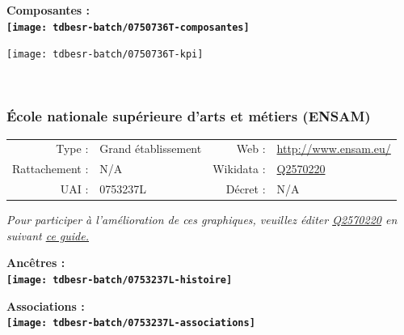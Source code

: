 \documentclass[12pt,french,]{article}
\begin{document}
\hrulefill

\begin{center} \bf Composantes : \\  
\texttt{[image: tdbesr-batch/0750736T-composantes]} \end{center}

\begin{center}\texttt{[image: tdbesr-batch/0750736T-kpi]} \end{center}\checkoddpage

\ifoddpage \fi ~\newpage  

\hypertarget{uxe9cole-nationale-supuxe9rieure-darts-et-muxe9tiers-ensam}{%
\subsubsection{École nationale supérieure d'arts et métiers
(ENSAM)}\label{uxe9cole-nationale-supuxe9rieure-darts-et-muxe9tiers-ensam}}

\begin{tabular*}{\textwidth}{rp{5cm}rl}  
\hline  
Type : & Grand établissement & Web : &\href{http://www.ensam.eu/}{http://www.ensam.eu/} \\  
Rattachement : & N/A & Wikidata : & \href{https://www.wikidata.org/entity/Q2570220}{Q2570220} \\  
UAI : & 0753237L & Décret : & N/A \\  
\hline  
\end{tabular*}

\textit{\scriptsize Pour participer à l'amélioration de ces graphiques, veuillez éditer  \href{https://www.wikidata.org/entity/Q2570220}{Q2570220}  en suivant \href{https://github.com/cpesr/wikidataESR/blob/master/Rmd/wikidataESR.md}{ce guide.}}

\vspace{1cm}  
\begin{minipage}[b]{0.50\textwidth}\begin{center} \bf Ancêtres : \\  
\texttt{[image: tdbesr-batch/0753237L-histoire]} \end{center}\end{minipage}\begin{minipage}[b]{0.50\textwidth}\begin{center} \bf Associations : \\  
\texttt{[image: tdbesr-batch/0753237L-associations]} \end{center}\end{minipage}
\end{document}
